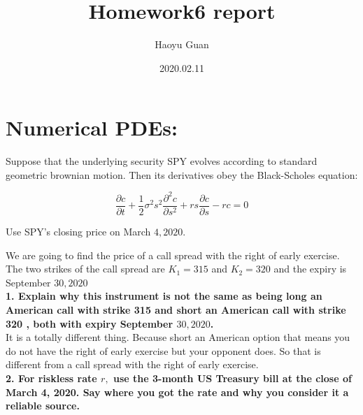 \documentclass{winnower}
\begin{document}
\title{Homework6 report}

\author{Haoyu Guan}








\date{2020.02.11}

\maketitle




\section{Numerical PDEs:}


\indent Suppose that the underlying security SPY evolves according to standard geometric brownian motion. Then its derivatives obey the Black-Scholes equation:

$$
\frac{\partial c}{\partial t}+\frac{1}{2} \sigma^{2} s^{2} \frac{\partial^{2} c}{\partial s^{2}}+r s \frac{\partial c}{\partial s}-r c=0
$$


Use SPY's closing price on March $4,2020$.


We are going to find the price of a call spread with the right of early exercise. The two strikes of the call spread are $K_{1}=315$ and $K_{2}=320$ and the expiry is September $30,2020$
\\





\textbf{1. Explain why this instrument is not the same as being long an American call with strike 315 and short an American call with strike 320 , both with expiry September $30,2020$.}
\\

It is a totally different thing. Because short an American option that means you do not have the right of early exercise but your opponent does. So that is different from a call spread with the right of early exercise.
\\

\textbf{2. For riskless rate $r,$ use the 3-month US Treasury bill at the close of March 4, 2020. Say where you got the rate and why you consider it a reliable source.}
\\
\end{document}

